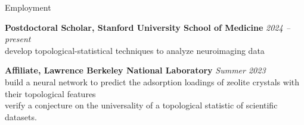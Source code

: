 \documentclass{resume} %
\begin{document}
\begin{rSection}{Employment}

{\bf Postdoctoral Scholar, Stanford University School of Medicine} \hfill
{\em 2024 -- present} \\
develop topological-statistical techniques to analyze neuroimaging data

{\bf Affiliate, Lawrence Berkeley National Laboratory} \hfill
{\em Summer 2023} \\
build a neural network to predict the adsorption loadings of zeolite crystals with their topological features\\
verify a conjecture on the universality of a topological statistic of scientific datasets.

\end{rSection}
\end{document}
